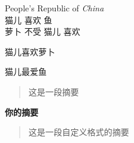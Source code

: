\documentclass{article}
\newcommand\PRC{People's Republic of  \emph{China}}
\newcommand\loves[2]{#1 喜欢 #2}
\newcommand\hatedby[2]{#2 不受 #1 喜欢}
\newcommand\love[3][喜欢]{#2#1#3}
\newenvironment{myabstract}[1][摘要]
		{
		\small
		\begin{center}\bfseries  #1\end{center}  %
		\begin{quotation} }%
		{\end{quotation}}
\begin{document}
		\PRC   \\
		\loves{猫儿}{鱼}    \\
		\hatedby{猫儿}{萝卜}
		
		\love{猫儿}{萝卜}
		
		\love[最爱]{猫儿}{鱼}
		
		\begin{abstract}
			这是一段摘要
		\end{abstract}
		
		\begin{myabstract}[你的摘要]
			这是一段自定义格式的摘要
		\end{myabstract}
		
\end{document}
